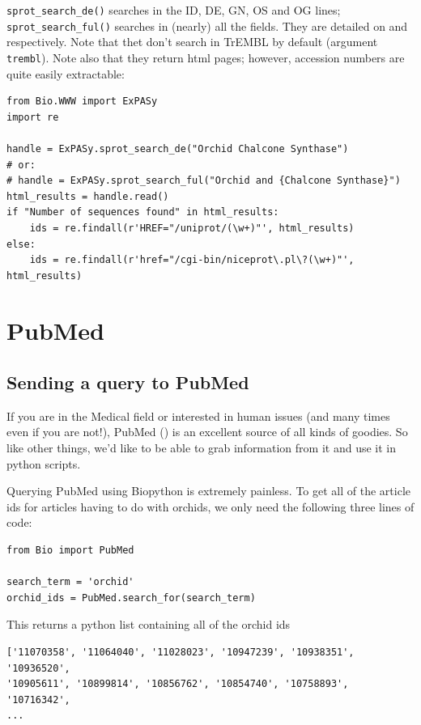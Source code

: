 \documentclass{report}
\begin{document}
\verb|sprot_search_de()| searches in the ID, DE, GN, OS and OG lines;
\verb|sprot_search_ful()| searches in (nearly) all the fields. They
are detailed on
 and
respectively. Note that thet don't search in TrEMBL by default
(argument \verb|trembl|). Note also that they return html pages;
however, accession numbers are quite easily extractable:

\begin{verbatim}
from Bio.WWW import ExPASy
import re

handle = ExPASy.sprot_search_de("Orchid Chalcone Synthase")
# or:
# handle = ExPASy.sprot_search_ful("Orchid and {Chalcone Synthase}")
html_results = handle.read()
if "Number of sequences found" in html_results:
    ids = re.findall(r'HREF="/uniprot/(\w+)"', html_results)
else:
    ids = re.findall(r'href="/cgi-bin/niceprot\.pl\?(\w+)"', html_results)
\end{verbatim}

\section{PubMed}
\label{sec:pub_med}

\subsection{Sending a query to PubMed}

If you are in the Medical field or interested in human issues (and many times even if you are not!), PubMed () is an excellent source of all kinds of goodies. So like other things, we'd like to be able to grab information from it and use it in python scripts.


Querying PubMed using Biopython is extremely painless. To get all of the article ids for articles having to do with orchids, we only need the following three lines of code:

\begin{verbatim}
from Bio import PubMed

search_term = 'orchid'
orchid_ids = PubMed.search_for(search_term)
\end{verbatim}

This returns a python list containing all of the orchid ids

\begin{verbatim}
['11070358', '11064040', '11028023', '10947239', '10938351', '10936520', 
'10905611', '10899814', '10856762', '10854740', '10758893', '10716342', 
...
\end{verbatim}
\end{document}
